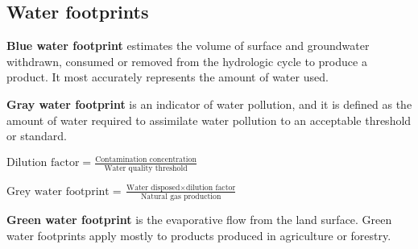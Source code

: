 
\subsection{Water footprints}

\textbf{Blue water footprint} estimates the volume of surface and groundwater
withdrawn, consumed or removed from the hydrologic cycle to produce a product.
It most accurately represents the amount of water used.

\textbf{Gray water footprint} is an indicator of water pollution, and it is
defined as the amount of water required to assimilate water pollution to an
acceptable threshold or standard.

$\text{Dilution factor} = \frac{\text{Contamination concentration}}
{\text{Water quality threshold}}$

$\text{Grey water footprint} = \frac{\text{Water disposed} \times
\text{dilution factor}}{\text{Natural gas production}}$

\textbf{Green water footprint} is the evaporative flow from the land surface.
Green water footprints apply mostly to products produced in agriculture or
forestry.

